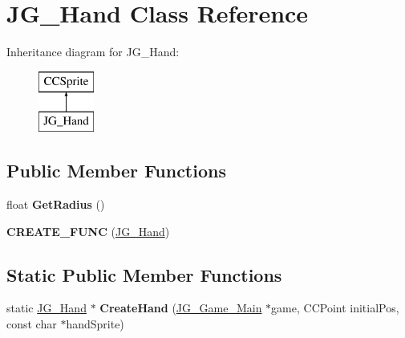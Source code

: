 \hypertarget{class_j_g___hand}{\section{J\-G\-\_\-\-Hand Class Reference}
\label{class_j_g___hand}
}
Inheritance diagram for J\-G\-\_\-\-Hand\-:\begin{figure}[H]
\begin{center}
\leavevmode
\includegraphics[height=2.000000cm]{class_j_g___hand}
\end{center}
\end{figure}
\subsection*{Public Member Functions}
\begin{DoxyCompactItemize}
\item 
\hypertarget{class_j_g___hand_aa66f82060cc53cf1790d2611476c76c0}{float {\bfseries Get\-Radius} ()}\label{class_j_g___hand_aa66f82060cc53cf1790d2611476c76c0}

\item 
\hypertarget{class_j_g___hand_aca220b8f6b4920e9324dd6b3e4f038ab}{{\bfseries C\-R\-E\-A\-T\-E\-\_\-\-F\-U\-N\-C} (\hyperlink{class_j_g___hand}{J\-G\-\_\-\-Hand})}\label{class_j_g___hand_aca220b8f6b4920e9324dd6b3e4f038ab}

\end{DoxyCompactItemize}
\subsection*{Static Public Member Functions}
\begin{DoxyCompactItemize}
\item 
\hypertarget{class_j_g___hand_a9154307d939ba402a3412a6ff9909247}{static \hyperlink{class_j_g___hand}{J\-G\-\_\-\-Hand} $\ast$ {\bfseries Create\-Hand} (\hyperlink{class_j_g___game___main}{J\-G\-\_\-\-Game\-\_\-\-Main} $\ast$game, C\-C\-Point initial\-Pos, const char $\ast$hand\-Sprite)}\label{class_j_g___hand_a9154307d939ba402a3412a6ff9909247}

\end{DoxyCompactItemize}
